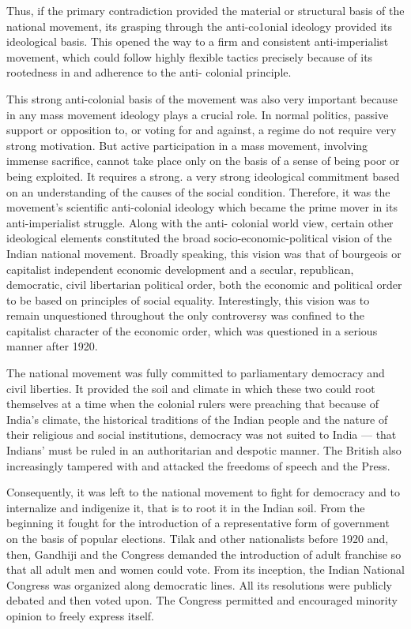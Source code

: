 Thus, if the primary contradiction provided the material or structural basis of the national movement, its grasping through the anti-co1onial ideology provided its ideological basis. This opened the way to a firm and consistent anti-imperialist movement, which could follow highly flexible tactics precisely because of its rootedness in and adherence to the anti- colonial principle.

This strong anti-colonial basis of the movement was also very important because in any mass movement ideology plays a crucial role. In normal politics, passive support or opposition to, or voting for and against, a regime do not require very strong motivation. But active participation in a mass movement, involving immense sacrifice, cannot take place only on the basis of a sense of being poor or being exploited. It requires a strong. a very strong ideological commitment based on an understanding of the causes of the social condition. Therefore, it was the movement's scientific anti-colonial ideology which became the prime mover in its anti-imperialist struggle. Along with the anti- colonial world view, certain other ideological elements constituted the broad socio-economic-political vision of the Indian national movement. Broadly speaking, this vision was that of bourgeois or capitalist independent economic development and a secular, republican, democratic, civil libertarian political order, both the economic and political order to be based on principles of social equality. Interestingly, this vision was to remain unquestioned throughout the only controversy was confined to the capitalist character of the economic order, which was questioned in a serious manner after 1920.

The national movement was fully committed to parliamentary democracy and civil liberties. It provided the soil and climate in which these two could root themselves at a time when the colonial rulers were preaching that because of India's climate, the historical traditions of the Indian people and the nature of their religious and social institutions, democracy was not suited to India --- that Indians' must be ruled in an authoritarian and despotic manner. The British also increasingly tampered with and attacked the freedoms of speech and the Press.

Consequently, it was left to the national movement to fight for democracy and to internalize and indigenize it, that is to root it in the Indian soil. From the beginning it fought for the introduction of a representative form of government on the basis of popular elections. Tilak and other nationalists before 1920 and, then, Gandhiji and the Congress demanded the introduction of adult franchise so that all adult men and women could vote. From its inception, the Indian National Congress was organized along democratic lines. All its resolutions were publicly debated and then voted upon. The Congress permitted and encouraged minority opinion to freely express itself.

